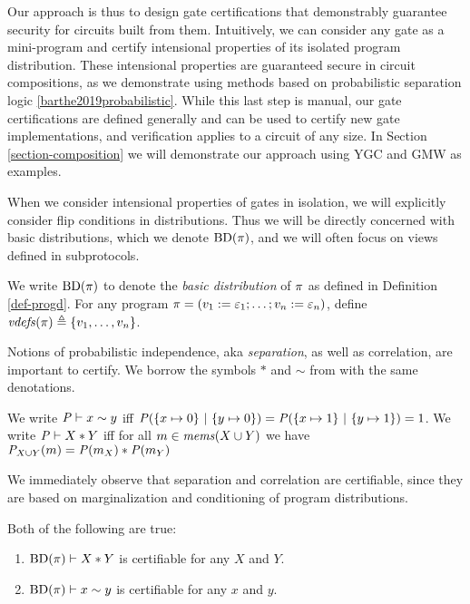 Our approach is thus to design gate certifications that demonstrably
guarantee security for circuits built from them. Intuitively, we can
consider any gate as a mini-program and certify intensional properties
of its isolated program distribution. These intensional properties are
guaranteed secure in circuit compositions, as we demonstrate using
methods based on probabilistic separation logic
\ref{barthe2019probabilistic}. While this last step is manual, our
gate certifications are defined generally and can be used to certify
new gate implementations, and verification applies to a circuit of any
size. In Section \ref{section-composition} we will demonstrate our
approach using YGC and GMW as examples.

When we consider intensional properties
of gates in isolation, we will explicitly consider flip conditions in
distributions. Thus we will be directly concerned with basic distributions,
which we denote $\mathrm{BD}(\pi)$, and we will often focus on views
defined in subprotocols. 
\begin{definition}
  We write $\mathrm{BD}(\pi)$ to denote the \emph{basic distribution} of
  $\pi$ as defined in Definition \ref{def-progd}. For any program $\pi =
  (v_1 := \varepsilon_1;\ldots;v_n := \varepsilon_n)$, define
  $\mathit{vdefs}(\pi) \triangleq \{ v_1,\ldots,v_n \}$.
\end{definition}
Notions of probabilistic independence, aka \emph{separation}, as well
as correlation, are important to certify. We borrow the symbols $*$
and $\sim$ from \cite{barthe2019probabilistic} with the same
denotations.
\begin{definition}
  We write $\mathit{P} \vdash x \sim y$ iff $\mathit{P}(\{ x \mapsto 0\}\ |\ \{ y \mapsto 0 \}) =
  \mathit{P}(\{ x \mapsto 1\}\ |\ \{ y \mapsto 1 \}) = 1$.
  We write $\mathit{P} \vdash X * Y$ iff for all
    $m \in \mathit{mems}(X \cup Y)$ we have
  ${\mathit{P}}_{X \cup Y}(m) =
  \mathit{P}(m_X) * \mathit{P}(m_Y)$
\end{definition}
We immediately observe that separation and correlation are certifiable,
since they are based on marginalization and conditioning of program
distributions. 
\begin{lemma}
  Both of the following are true:
  \begin{enumerate}
  \item $\mathrm{BD}(\pi) \vdash X * Y$ is certifiable for any $X$ and $Y$.
  \item $\mathrm{BD}(\pi) \vdash x \sim y$ is certifiable for any $x$ and $y$.
  \end{enumerate}
\end{lemma}

